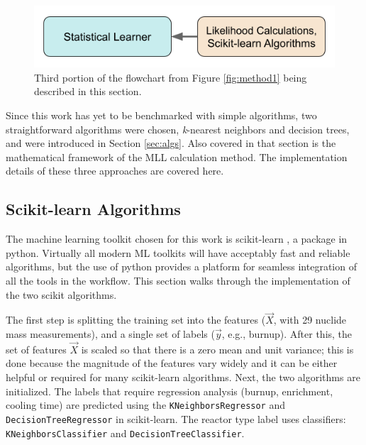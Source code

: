 
\begin{figure}[H]
  \centering
  \includegraphics[width=0.7\linewidth]{./chapters/exp1/methodology1_3.png}
  \caption[Third portion of the flowchart from Figure \ref{fig:method1}]
          {Third portion of the flowchart from Figure \ref{fig:method1} being 
           described in this section.}
\end{figure}

Since this work has yet to be benchmarked with simple algorithms, two
straightforward algorithms were chosen, \textit{k}-nearest neighbors and
decision trees, and were introduced in Section \ref{sec:algs}. Also covered in
that section is the mathematical framework of the \gls{MLL} calculation method.
The implementation details of these three approaches are covered here. 

\subsection{Scikit-learn Algorithms}

The machine learning toolkit chosen for this work is scikit-learn
\cite{scikit}, a package in python.  Virtually all modern \gls{ML} toolkits
will have acceptably fast and reliable algorithms, but the use of python
provides a platform for seamless integration of all the tools in the workflow.
This section walks through the implementation of the two scikit algorithms. 

The first step is splitting the training set into the features ($\vec{X}$, with
29 nuclide mass measurements), and a single set of labels ($\vec{y}$, e.g.,
burnup). After this, the set of features $\vec{X}$ is scaled so that there is a
zero mean and unit variance; this is done because the magnitude of the features
vary widely and it can be either helpful or required for many scikit-learn
algorithms. Next, the two algorithms are initialized.  The labels that require
regression analysis (burnup, enrichment, cooling time) are predicted using the
\texttt{KNeighborsRegressor} and \texttt{DecisionTreeRegressor} in
scikit-learn. The reactor type label uses classifiers:
\texttt{KNeighborsClassifier} and \texttt{DecisionTreeClassifier}.  

